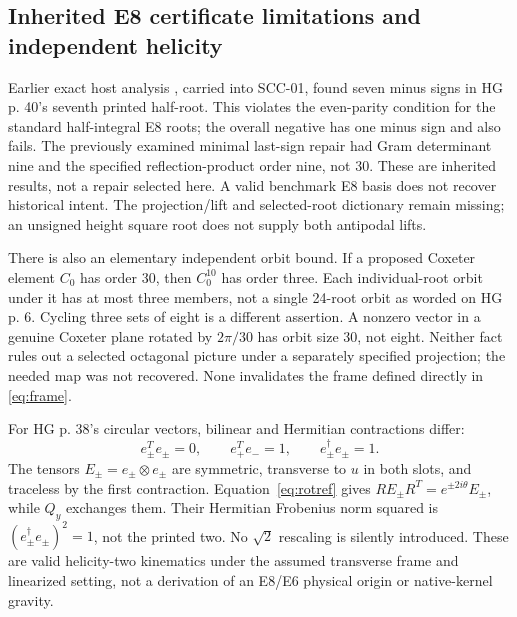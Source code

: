 \documentclass[11pt,a4paper]{article}
\numberwithin{equation}{section}
\begin{document}
\subsection{Inherited E8 certificate limitations and independent helicity}
Earlier exact host analysis \cite{host}, carried into SCC-01, found seven minus signs in HG p. 40's seventh printed half-root. This violates the even-parity condition for the standard half-integral E8 roots; the overall negative has one minus sign and also fails. The previously examined minimal last-sign repair had Gram determinant nine and the specified reflection-product order nine, not 30. These are inherited results, not a repair selected here. A valid benchmark E8 basis does not recover historical intent. The projection/lift and selected-root dictionary remain missing; an unsigned height square root does not supply both antipodal lifts.

There is also an elementary independent orbit bound. If a proposed Coxeter element $C_0$ has order 30, then $C_0^{10}$ has order three. Each individual-root orbit under it has at most three members, not a single 24-root orbit as worded on HG p. 6. Cycling three sets of eight is a different assertion. A nonzero vector in a genuine Coxeter plane rotated by $2\pi/30$ has orbit size 30, not eight. Neither fact rules out a selected octagonal picture under a separately specified projection; the needed map was not recovered. None invalidates the frame defined directly in \eqref{eq:frame}.

For HG p. 38's circular vectors, bilinear and Hermitian contractions differ:
\begin{equation}
 e_\pm^Te_\pm=0,\qquad e_+^Te_-=1,\qquad e_\pm^\dagger e_\pm=1.
\end{equation}
The tensors $E_\pm=e_\pm\otimes e_\pm$ are symmetric, transverse to $u$ in both slots, and traceless by the first contraction. Equation~\eqref{eq:rotref} gives $R E_\pm R^T=e^{\pm2i\theta}E_\pm$, while $Q_y$ exchanges them. Their Hermitian Frobenius norm squared is $(e_\pm^\dagger e_\pm)^2=1$, not the printed two. No $\sqrt2$ rescaling is silently introduced. These are valid helicity-two kinematics under the assumed transverse frame and linearized setting, not a derivation of an E8/E6 physical origin or native-kernel gravity.
\end{document}
